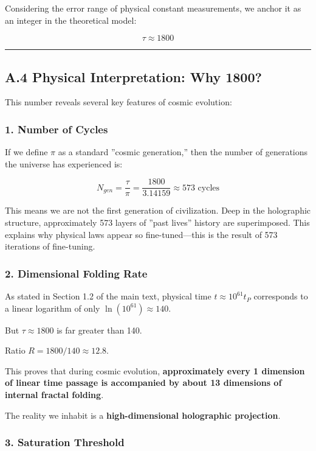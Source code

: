 Considering the error range of physical constant measurements, we anchor it as an integer in the theoretical model:

\textbf{$$\tau \approx 1800$$}

\hrule

\subsection{A.4 Physical Interpretation: Why 1800?}

This number reveals several key features of cosmic evolution:

\subsubsection{1. Number of Cycles}

If we define $\pi$ as a standard ''cosmic generation,'' then the number of generations the universe has experienced is:

$$N_{gen} = \frac{\tau}{\pi} = \frac{1800}{3.14159} \approx 573 \text{ cycles}$$

This means we are not the first generation of civilization. Deep in the holographic structure, approximately 573 layers of ''past lives'' history are superimposed. This explains why physical laws appear so fine-tuned---this is the result of 573 iterations of fine-tuning.

\subsubsection{2. Dimensional Folding Rate}

As stated in Section 1.2 of the main text, physical time $t \approx 10^{61} t_P$ corresponds to a linear logarithm of only $\ln(10^{61}) \approx 140$.

But $\tau \approx 1800$ is far greater than 140.

Ratio $R = 1800 / 140 \approx 12.8$.

This proves that during cosmic evolution, \textbf{approximately every 1 dimension of linear time passage is accompanied by about 13 dimensions of internal fractal folding}.

The reality we inhabit is a \textbf{high-dimensional holographic projection}.

\subsubsection{3. Saturation Threshold}

